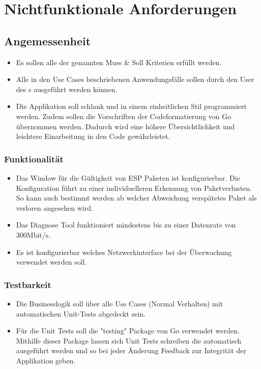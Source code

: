 \section{Nichtfunktionale Anforderungen}
\label{sec:Nichtfunktionale Anforderungen}

\subsection{Angemessenheit}
\begin{itemize}
\item Es sollen alle der genannten Muss \& Soll Kriterien erfüllt werden.
\item Alle in den Use Cases beschriebenen Anwendungsfälle sollen durch den User des \tool{}s ausgeführt werden können.
\item Die Applikation soll schlank und in einem einheitlichen Stil programmiert werden. Zudem sollen die Vorschriften der Codeformatierung von Go übernommen werden. Dadurch wird eine höhere Übersichtlichkeit und leichtere Einarbeitung in den Code gewährleistet.
\end{itemize}

\subsubsection{Funktionalität}
\begin{itemize}
\item Das Window für die Gültigkeit von \ac{ESP} Paketen ist konfigurierbar. Die Konfiguration führt zu einer individuelleren Erkennung von Paketverlusten. So kann auch bestimmt werden ab welcher Abweichung verspätetes Paket als verloren angesehen wird.
\item Das Diagnose Tool funktioniert mindestens bis zu einer Datenrate von 300Mbit/s.
\item Es ist konfigurierbar welches Netzwerkinterface bei der Überwachung verwendet werden soll.
\end{itemize}

\subsubsection{Testbarkeit}
\begin{itemize}
\item Die Businesslogik soll über alle Use Cases (Normal Verhalten) mit automatischen Unit-Tests abgedeckt sein.
\item Für die Unit Tests soll die "testing" Package von Go verwendet werden. Mithilfe dieser Package lassen sich Unit Tests schreiben die automatisch ausgeführt werden und so bei jeder Änderung Feedback zur Integrität der Applikation geben.
\end{itemize}

